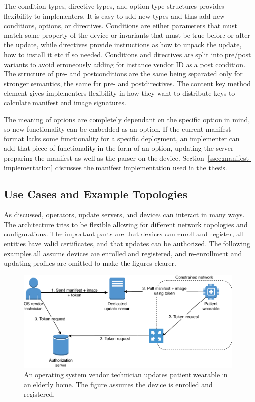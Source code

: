 \documentclass[0-thesis.tex]{subfiles}
\begin{document}
The condition types, directive types, and option type structures provides flexibility to
implementers. It is easy to add new types and thus add new conditions, options, or
directives. Conditions are either parameters that must match some property of the device
or invariants that must be true before or after the update, while directives provide
instructions as how to unpack the update, how to install it etc if so needed. Conditions
and directives are split into pre/post variants to avoid erroneously adding for instance
vendor ID as a post condition. The structure of pre- and postconditions are the same being
separated only for stronger semantics, the same for pre- and postdirectives. The content
key method element gives implementers flexibility in how they want to distribute keys to
calculate manifest and image signatures.

The meaning of options are completely dependant on the specific option in mind, so new
functionality can be embedded as an option. If the current manifest format lacks some
functionality for a specific deployment, an implementer can add that piece of
functionality in the form of an option, updating the server preparing the manifest as well
as the parser on the device. Section~\ref{ssec:manifest-implementation} discusses the
manifest implementation used in the thesis.

\subsection{Use Cases and Example Topologies}
\label{ssec:use-cases-examples-topologies}
As discussed, operators, update servers, and devices can interact in many ways. The
architecture tries to be flexible allowing for different network topologies and
configurations. The important parts are that devices can enroll and register, all entities
have valid certificates, and that updates can be authorized. The following examples all
assume devices are enrolled and registered, and re-enrollment and updating profiles are
omitted to make the figures clearer.

\begin{figure}[t]
    \caption{An operating system vendor technician updates patient wearable in an elderly home. The figure assumes the device is enrolled and registered.}
    \label{fig:elderly-home}
    \includegraphics{images/use-case-elderly-home.pdf}
\end{figure}
\end{document}
